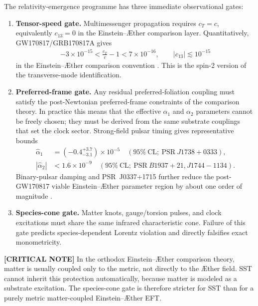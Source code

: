 The relativity-emergence programme has three immediate observational gates:
\begin{enumerate}
    \item \textbf{Tensor-speed gate.} Multimessenger propagation requires
    \(c_T=c\), equivalently \(c_{13}=0\) in the Einstein--\AE ther comparison
    layer. Quantitatively, GW170817/GRB170817A gives
    \begin{align}
        -3\times10^{-15}
        <
        \frac{c_T}{c}-1
        <
        7\times10^{-16},
        \qquad
        |c_{13}|\lesssim10^{-15}
        \label{eq:rt_tensor_speed_observational_gate}
    \end{align}
    in the Einstein--\AE ther comparison convention \cite{LIGOVirgoFermiINTEGRAL2017,OostMukohyamaWang2018}.
    This is the spin-2 version of the transverse-mode identification.
    \item \textbf{Preferred-frame gate.} Any residual preferred-foliation
    coupling must satisfy the post-Newtonian preferred-frame constraints of
    the comparison theory. In practice this means that the effective
    \(\alpha_1\) and \(\alpha_2\) parameters cannot be freely chosen; they must
    be derived from the same substrate couplings that set the clock sector.
    Strong-field pulsar timing gives representative bounds
    \begin{align}
        \hat\alpha_1
        &=
        (-0.4^{+3.7}_{-3.1})\times10^{-5}
        \quad(95\%\ \mathrm{CL};\ \mathrm{PSR}\ J1738+0333),
        \\
        |\hat\alpha_2|
        &<
        1.6\times10^{-9}
        \quad(95\%\ \mathrm{CL};\ \mathrm{PSR}\ B1937+21,J1744-1134).
        \label{eq:rt_preferred_frame_observational_gate}
    \end{align}
    Binary-pulsar damping and PSR~J0337+1715 further reduce the post-GW170817
    viable Einstein--\AE ther parameter region by about one order of magnitude
    \cite{ShaoWex2012,ShaoCaballeroKramerWexChampionJessner2013,GuptaHerreroValeaBlasBarausseCornishYagiYunes2021}.
    \item \textbf{Species-cone gate.} Matter knots, gauge/torsion pulses, and
    clock excitations must share the same infrared characteristic cone. Failure
    of this gate predicts species-dependent Lorentz violation and directly
    falsifies exact monometricity.
\end{enumerate}

\textbf{[CRITICAL NOTE]} In the orthodox Einstein--\AE ther comparison theory,
matter is usually coupled only to the metric, not directly to the \AE ther field.
SST cannot inherit this protection automatically, because matter is modeled as a
substrate excitation. The species-cone gate is therefore stricter for SST than
for a purely metric matter-coupled Einstein--\AE ther EFT.

